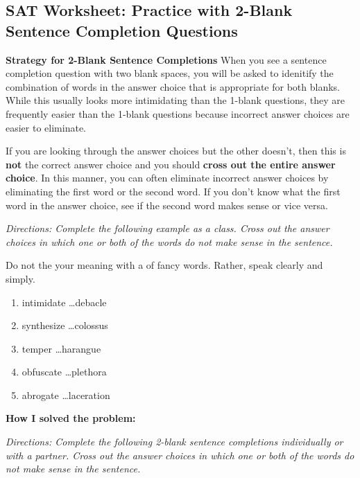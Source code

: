 \subsection{\sloppy SAT Worksheet: Practice with 2-Blank Sentence Completion Questions}
 
\textbf{Strategy for 2-Blank Sentence Completions}
When you see a sentence completion question with two blank spaces, you will be asked to idenitify the combination of words in the answer choice that is appropriate for both blanks. While this usually looks more intimidating than the 1-blank questions, they are frequently easier than the 1-blank questions because incorrect answer choices are easier to eliminate.  


If you are looking through the answer choices but the other doesn't, then this is \textbf{not} the correct answer choice and you should \textbf{cross out the entire answer choice}. In this manner, you can often eliminate incorrect answer choices by eliminating the first word or the second word. If you don't know what the first word in the answer choice, see if the second word makes sense or vice versa. 

\bigskip
\textit{Directions: Complete the following example as a class. Cross out the answer choices in which one or both of the words do not make sense in the sentence.}

Do not \longline the your meaning with a \longline of fancy words. Rather, speak clearly and simply. 

\begin{enumerate} [label=(\Alph*)]
\item intimidate \ldots debacle
\item synthesize \ldots colossus
\item temper \ldots harangue
\item obfuscate \ldots plethora
\item abrogate \ldots laceration
\end{enumerate} 

\textbf{\large How I solved the problem:} \hrulefill


\bigskip
\textit{Directions: Complete the following 2-blank sentence completions individually or with a partner. Cross out the answer choices in which one or both of the words do not make sense in the sentence.}

